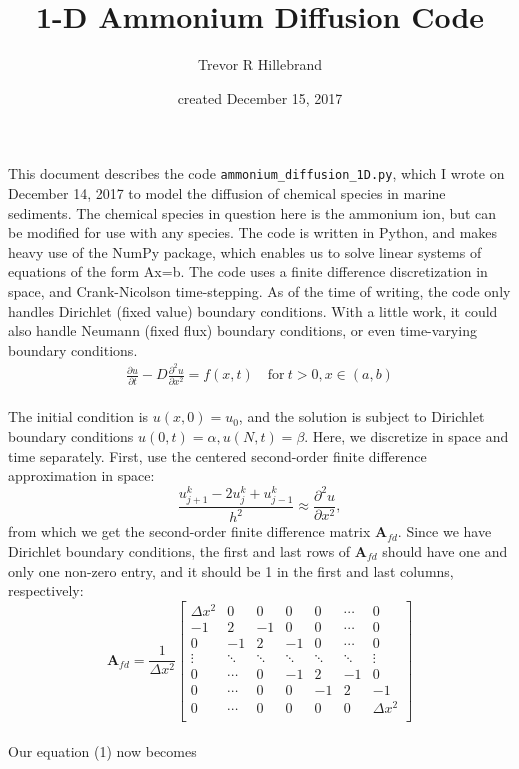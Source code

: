\documentclass[11pt, oneside]{article}   	%
\title{1-D Ammonium Diffusion Code}
\author{Trevor R Hillebrand}
\date{created December 15, 2017}							%
\begin{document}
\maketitle

This document describes the code \verb|ammonium_diffusion_1D.py|, which I wrote on December 14, 2017 to model the diffusion of chemical species in marine sediments. The chemical species in question here is the ammonium ion, but can be modified for use with any species. The code is written in Python, and makes heavy use of the NumPy package, which enables us to solve linear systems of equations of the form Ax=b. The code uses a finite difference discretization in space, and Crank-Nicolson time-stepping. As of the time of writing, the code only handles Dirichlet (fixed value) boundary conditions. With a little work, it could also handle Neumann (fixed flux)  boundary conditions, or even time-varying boundary conditions.\\

\begin{gather}
\frac{\partial u}{\partial t} - D\frac{\partial^2 u}{\partial x^2} = f(x,t) \quad \text{for}\ t>0, x \in (a,b)
\end{gather}
\\
The initial condition is $u(x,0) = u_0$, and the solution is subject to Dirichlet boundary conditions
$u(0,t) = \alpha, u(N,t) = \beta$. Here, we discretize in space and time separately. First, use the centered second-order finite difference approximation in space:
\begin{equation*}
\frac{u^k_{j+1} - 2u^k_j + u^k_{j-1}}{h^2} \approx \frac{\partial^2 u}{\partial x^2} ,
\end{equation*}
from which we get the second-order finite difference matrix $\textbf{A}_{fd}$. Since we have Dirichlet boundary conditions, the first and last rows of $\textbf{A}_{fd}$ should have one and only one non-zero entry, and it should be 1 in the first and last columns, respectively:
\\
\[
\textbf{A}_{fd} = \frac{1}{\Delta x^2}
\begin{bmatrix}
	\Delta x^2  	 & 0           & 0        & 0       & 0 		& \cdots 	& 0 \\
	-1	 & 2           & -1       & 0       & 0 		&\cdots 	& 0\\
	0 	 & -1          & 2       & -1      &  0 		& \cdots 	& 0 \\
	\vdots& \ddots   &\ddots  &\ddots& \ddots	& \ddots 	& \vdots \\
	0	&  \cdots	& 0		& -1	&2		&-1		& 0 \\
	0	 & \cdots	&0 &0	  &-1		& 2		&-1\\
	0	& \cdots	&0	&0	&0		&0		&\Delta x^2\\
\end{bmatrix}
\]
\\
Our equation (1) now becomes
\end{document}
